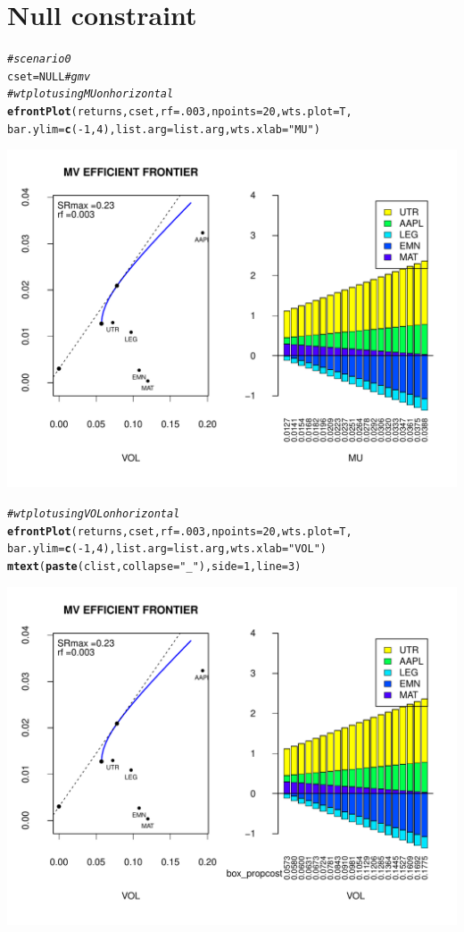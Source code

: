\documentclass{uwstat518}\usepackage[]{graphicx}\usepackage[]{color}
\makeatletter
\def\maxwidth{ %
  \ifdim\Gin@nat@width>\linewidth
    \linewidth
  \else
    \Gin@nat@width
  \fi
}
\newcommand{\hlstr}[1]{\textcolor[rgb]{0.192,0.494,0.8}{#1}}%
\newcommand{\hlcom}[1]{\textcolor[rgb]{0.678,0.584,0.686}{\textit{#1}}}%
\newcommand{\hlkwd}[1]{\textcolor[rgb]{0.737,0.353,0.396}{\textbf{#1}}}%
\newenvironment{kframe}{%
 \def\at@end@of@kframe{}%
 \ifinner\ifhmode%
  \def\at@end@of@kframe{\end{minipage}}%
  \begin{minipage}{\columnwidth}%
 \fi\fi%
 \def\FrameCommand##1{\hskip\@totalleftmargin \hskip-\fboxsep
 \colorbox{shadecolor}{##1}\hskip-\fboxsep
     \hskip-\linewidth \hskip-\@totalleftmargin \hskip\columnwidth}%
 \MakeFramed {\advance\hsize-\width
   \@totalleftmargin\z@ \linewidth\hsize
   \@setminipage}}%
 {\par\unskip\endMakeFramed%
 \at@end@of@kframe}
\newenvironment{knitrout}{}{} %
\makeatother
\begin{document}
\section{Null constraint}
\begin{knitrout}
\color{fgcolor}\begin{kframe}
\begin{alltt}
\hlcom{# scenario 0}
cset=NULL \hlcom{# gmv}
\hlcom{#wt plot using MU on horizontal }
\hlkwd{efrontPlot}(returns, cset, rf = .003, npoints = 20,wts.plot = T,
		bar.ylim = \hlkwd{c}(-1,4),list.arg=list.arg, wts.xlab=\hlstr{"MU"})
\end{alltt}
\end{kframe}
\includegraphics[width=\maxwidth]{figure/unnamed-chunk-31} 
\begin{kframe}\begin{alltt}
\hlcom{#wt plot using VOL on horizontal }
\hlkwd{efrontPlot}(returns, cset, rf = .003, npoints = 20,wts.plot = T,
		bar.ylim = \hlkwd{c}(-1,4),list.arg=list.arg, wts.xlab=\hlstr{"VOL"})
\hlkwd{mtext}(\hlkwd{paste}(clist,collapse=\hlstr{"_"}),side=1,line=3)
\end{alltt}
\end{kframe}
\includegraphics[width=\maxwidth]{figure/unnamed-chunk-32} 

\end{knitrout}
\end{document}
